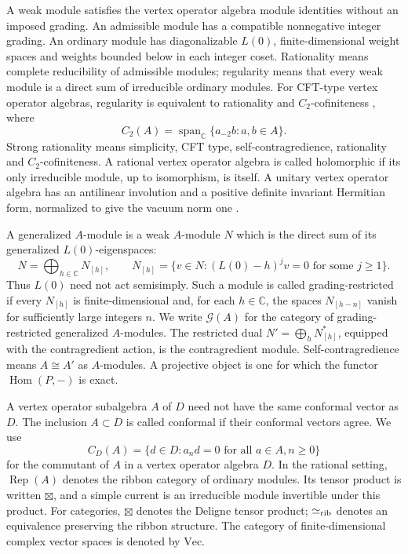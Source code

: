 \documentclass[11pt,reqno]{amsart}
\theoremstyle{definition}\newtheorem{definition}[theorem]{Definition}
\theoremstyle{remark}\newtheorem{remark}[theorem]{Remark}
\newcommand{\C}{\mathbb C}\newcommand{\Z}{\mathbb Z}\newcommand{\Q}{\mathbb Q}
\newcommand{\Rep}{\operatorname{Rep}}
\numberwithin{equation}{section}
\begin{document}
A weak module satisfies the vertex operator algebra module identities without an imposed grading. An admissible module has a compatible nonnegative integer grading. An ordinary module has diagonalizable $L(0)$, finite-dimensional weight spaces and weights bounded below in each integer coset. Rationality means complete reducibility of admissible modules; regularity means that every weak module is a direct sum of irreducible ordinary modules. For CFT-type vertex operator algebras, regularity is equivalent to rationality and $C_2$-cofiniteness \cite{ABD}, where
\[
 C_2(A)=\operatorname{span}_{\C}\{a_{-2}b:a,b\in A\}.
\]
Strong rationality means simplicity, CFT type, self-contragredience, rationality and $C_2$-cofiniteness. A rational vertex operator algebra is called holomorphic if its only irreducible module, up to isomorphism, is itself. A unitary vertex operator algebra has an antilinear involution and a positive definite invariant Hermitian form, normalized to give the vacuum norm one \cite{DLUnitary}.

A generalized $A$-module is a weak $A$-module $N$ which is the direct sum of its generalized $L(0)$-eigenspaces:
\[
 N=\bigoplus_{h\in\C}N_{[h]},\qquad
 N_{[h]}=\{v\in N:(L(0)-h)^jv=0\text{ for some }j\ge1\}.
\]
Thus $L(0)$ need not act semisimply. Such a module is called grading-restricted if every $N_{[h]}$ is finite-dimensional and, for each $h\in\C$, the spaces $N_{[h-n]}$ vanish for sufficiently large integers $n$. We write $\mathcal G(A)$ for the category of grading-restricted generalized $A$-modules. The restricted dual $N'=\bigoplus_hN_{[h]}^*$, equipped with the contragredient action, is the contragredient module. Self-contragredience means $A\cong A'$ as $A$-modules. A projective object is one for which the functor $\operatorname{Hom}(P,-)$ is exact.

A vertex operator subalgebra $A$ of $D$ need not have the same conformal vector as $D$. The inclusion $A\subset D$ is called conformal if their conformal vectors agree. We use
\[
 C_D(A)=\{d\in D:a_nd=0\text{ for all }a\in A, n\ge0\}
\]
for the commutant of $A$ in a vertex operator algebra $D$. In the rational setting, $\Rep(A)$ denotes the ribbon category of ordinary modules. Its tensor product is written $\boxtimes$, and a simple current is an irreducible module invertible under this product. For categories, $\boxtimes$ denotes the Deligne tensor product; $\simeq_{\rm rib}$ denotes an equivalence preserving the ribbon structure. The category of finite-dimensional complex vector spaces is denoted by $\mathrm{Vec}$.
\end{document}
